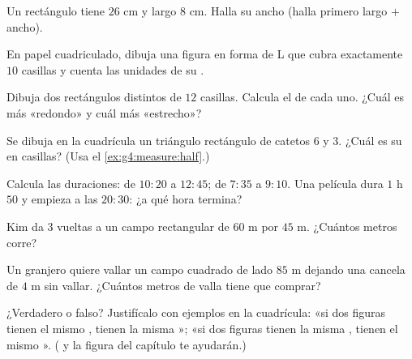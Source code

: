 \begin{exercise}[$\star$]\label{exo:g4:measure:4}
Un rectángulo tiene  $26$ cm y largo $8$ cm. Halla su ancho
(halla primero largo $+$ ancho).
\end{exercise}

\begin{exercise}[$\star$]\label{exo:g4:measure:5}
En papel cuadriculado, dibuja una figura en forma de L que cubra exactamente $10$
casillas y cuenta las unidades de su .
\end{exercise}

\begin{exercise}[$\star$]\label{exo:g4:measure:6}
Dibuja dos rectángulos distintos de  $12$ casillas. Calcula el
 de cada uno. ¿Cuál es más «redondo» y cuál más «estrecho»?
\end{exercise}

\begin{exercise}[$\star$]\label{exo:g4:measure:7}
Se dibuja en la cuadrícula un triángulo rectángulo de catetos $6$ y $3$. ¿Cuál es
su  en casillas? (Usa el \cref{ex:g4:measure:half}.)
\end{exercise}

\begin{exercise}[$\star$]\label{exo:g4:measure:8}
Calcula las duraciones: de $10{:}20$ a $12{:}45$; de $7{:}35$ a
$9{:}10$. Una película dura $1$ h $50$ y empieza a las $20{:}30$: ¿a qué hora
termina?
\end{exercise}

\begin{exercise}[$\star$]\label{exo:g4:measure:9}
Kim da $3$ vueltas a un campo rectangular de $60$ m por $45$ m. ¿Cuántos
metros corre?
\end{exercise}

\begin{exercise}[$\star\star$]\label{exo:g4:measure:10}
Un granjero quiere vallar un campo cuadrado de lado $85$ m dejando
una cancela de $4$ m sin vallar. ¿Cuántos metros de valla tiene que comprar?
\end{exercise}

\begin{exercise}[$\star\star$]\label{exo:g4:measure:11}
¿Verdadero o falso? Justifícalo con ejemplos en la cuadrícula: «si dos figuras tienen el mismo
, tienen la misma »; «si dos figuras tienen la misma
, tienen el mismo ».
( y la figura del capítulo te ayudarán.)
\end{exercise}
